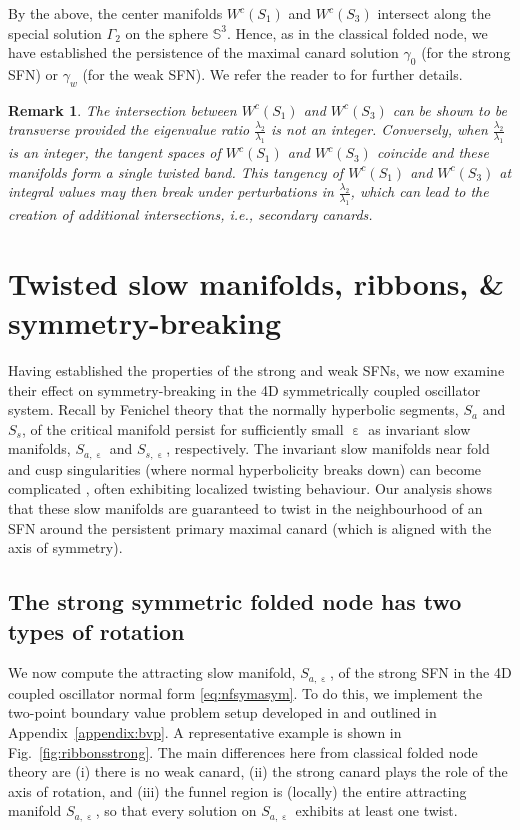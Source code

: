 \documentclass[10pt,onecolumn]{article}
\theoremstyle{plain}
\newtheorem{remark}{Remark}[section]
\DeclareMathOperator{\eps}{\varepsilon}
\begin{document}
By the above, the center manifolds $W^c(S_1)$ and $W^c(S_3)$ intersect along the special solution $\Gamma_2$ on the sphere $\mathbb S^3$. 
Hence, as in the classical folded node, we have established the persistence of the maximal canard solution $\gamma_0$ (for the strong SFN) or $\gamma_w$ (for the weak SFN). 
We refer the reader to \cite{Mitry2017,Szmolyan2001,Wex2005} for further details.

\medskip
\begin{remark}
The intersection between $W^c(S_1)$ and $W^c(S_3)$ can be shown to be transverse provided the eigenvalue ratio $\tfrac{\lambda_2}{\lambda_1}$ is not an integer. Conversely, when $\tfrac{\lambda_2}{\lambda_1}$ is an integer, the tangent spaces of $W^c(S_1)$ and $W^c(S_3)$ coincide and these manifolds form a single twisted band. This tangency of $W^c(S_1)$ and $W^c(S_3)$ at integral values may then break under perturbations in $\tfrac{\lambda_2}{\lambda_1}$, which can lead to the creation of additional intersections, i.e., secondary canards.
\end{remark}


\section{Twisted slow manifolds, ribbons, \& symmetry-breaking} \label{sec:ribbons}
Having established the properties of the strong and weak SFNs, we now examine their effect on symmetry-breaking in the 4D symmetrically coupled oscillator system. Recall by Fenichel theory that the normally hyperbolic segments, $S_a$ and $S_s$, of the critical manifold persist for sufficiently small $\eps$ as invariant slow manifolds, $S_{a,\eps}$ and $S_{s,\eps}$, respectively. The invariant slow manifolds near fold and cusp singularities (where normal hyperbolicity breaks down) can become complicated \cite{Broer2013,Kristiansen2023,Szmolyan2001}, often exhibiting localized twisting behaviour. Our analysis shows that these slow manifolds are guaranteed to twist in the neighbourhood of an SFN around the persistent primary maximal canard (which is aligned with the axis of symmetry). 

\subsection{The strong symmetric folded node has two types of rotation}
We now compute the attracting slow manifold, $S_{a,\eps}$, of the strong SFN in the 4D coupled oscillator normal form \eqref{eq:nfsymasym}. 
To do this, we implement the two-point boundary value problem setup developed in \cite{Desroches2008,Hasan2017} and outlined in Appendix~\ref{appendix:bvp}. A representative example is shown in Fig.~\ref{fig:ribbonsstrong}. The main differences here from classical folded node theory are (i) there is no weak canard, (ii) the strong canard plays the role of the axis of rotation, and (iii) the funnel region is (locally) the entire attracting manifold $S_{a,\eps}$, so that every solution on $S_{a,\eps}$ exhibits at least one twist. 
\end{document}
